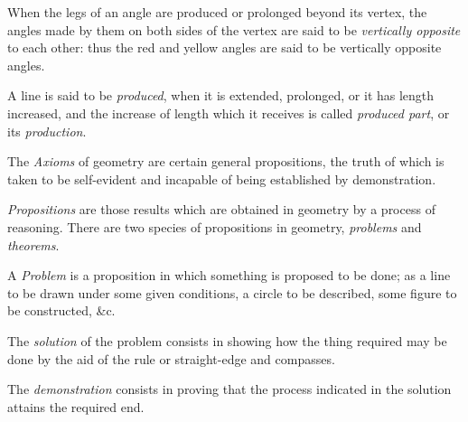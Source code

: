 \documentclass[booklanguage=english]{byrnebook}
\begin{document}
When the legs of an angle are produced or prolonged beyond its vertex, the angles made by them on both sides of the vertex are said to be \emph{vertically opposite} to each other: thus the red and yellow angles are said to be vertically opposite angles.


A line is said to be \emph{produced}, when it is extended, prolonged, or it has length increased, and the increase of length which it receives is called \emph{produced part}, or its \emph{production}.



The \emph{Axioms} of geometry are certain general propositions, the truth of which is taken to be self-evident and incapable of being established by demonstration.

\emph{Propositions} are those results which are obtained in geometry by a process of reasoning. There are two species of propositions in geometry, \emph{problems} and \emph{theorems}.

A \emph{Problem} is a proposition in which something is proposed to be done; as a line to be drawn under some given conditions, a circle to be described, some figure to be constructed, \&c.

The \emph{solution} of the problem consists in showing how the thing required may be done by the aid of the rule or straight-edge and compasses.

The \emph{demonstration} consists in proving that the process indicated in the solution attains the required end.
\end{document}
